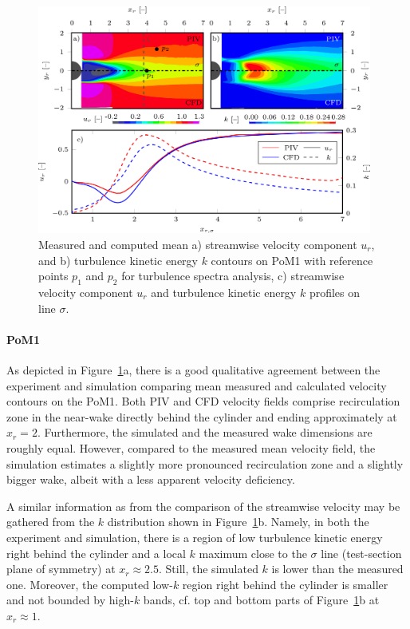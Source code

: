 \begin{figure}[htbp]
    \includegraphics[width=0.98\textwidth]{02_images/00_export/figure5.png}
    \caption{Measured and computed mean a) streamwise velocity component $u_r$, and b) turbulence kinetic energy $k$ contours on PoM1 with reference points $p_{1}$ and $p_{2}$ for turbulence spectra analysis, c) streamwise velocity component $u_r$ and turbulence kinetic energy $k$ profiles on line $\sigma$.}
    \label{fig:meansPom1}
\end{figure}

\paragraph{PoM1}
As depicted in Figure~\ref{fig:meansPom1}a, there is a good qualitative agreement between the experiment and simulation comparing mean measured and calculated velocity contours on the PoM1. Both PIV and CFD velocity fields comprise recirculation zone in the near-wake directly behind the cylinder and ending approximately at $x_{{r}} = 2$. Furthermore, the simulated and the measured wake dimensions are roughly equal. However, compared to the measured mean velocity field, the simulation estimates a slightly more pronounced recirculation zone and a slightly bigger wake, albeit with a less apparent velocity deficiency.

A similar information as from the comparison of {the} streamwise velocity may be gathered from the {$k$} distribution {shown} in Figure~\ref{fig:meansPom1}b. Namely, in both the experiment and simulation, there is a region of low turbulence kinetic energy right behind the cylinder and a local {$k$} maximum close to the {$\sigma$ line (test-section plane of symmetry)} at $x_r \approx 2.5$. Still, the simulated $k$ is lower than the measured one. Moreover, the computed low-$k$ region right behind the cylinder is smaller and not bounded by high-$k$ bands, cf. {top and bottom parts of} Figure~\ref{fig:meansPom1}b at $x_r\approx 1$. 

